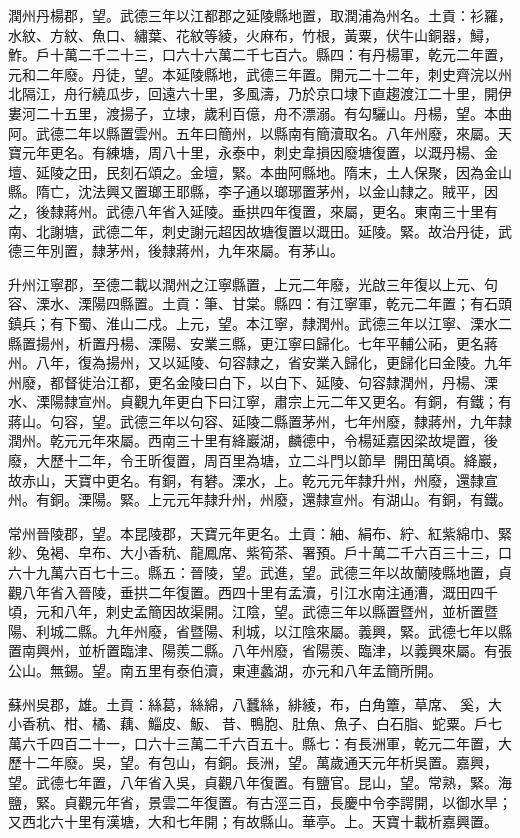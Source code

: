 \begin{pinyinscope}
 潤州丹楊郡，望。武德三年以江都郡之延陵縣地置，取潤浦為州名。土貢：衫羅，水紋、方紋、魚口、繡葉、花紋等綾，火麻布，竹根，黃粟，伏牛山銅器，鱘，鮓。戶十萬二千二十三，口六十六萬二千七百六。縣四：有丹楊軍，乾元二年置，元和二年廢。丹徒，望。本延陵縣地，武德三年置。開元二十二年，刺史齊浣以州北隔江，舟行繞瓜步，回遠六十里，多風濤，乃於京口埭下直趨渡江二十里，開伊婁河二十五里，渡揚子，立埭，歲利百億，舟不漂溺。有勾驪山。丹楊，望。本曲阿。武德二年以縣置雲州。五年曰簡州，以縣南有簡瀆取名。八年州廢，來屬。天寶元年更名。有練塘，周八十里，永泰中，刺史韋損因廢塘復置，以溉丹楊、金壇、延陵之田，民刻石頌之。金壇，緊。本曲阿縣地。隋末，土人保聚，因為金山縣。隋亡，沈法興又置瑯王耶縣，李子通以瑯琊置茅州，以金山隸之。賊平，因之，後隸蔣州。武德八年省入延陵。垂拱四年復置，來屬，更名。東南三十里有南、北謝塘，武德二年，刺史謝元超因故塘復置以溉田。延陵。緊。故治丹徒，武德三年別置，隸茅州，後隸蔣州，九年來屬。有茅山。



 升州江寧郡，至德二載以潤州之江寧縣置，上元二年廢，光啟三年復以上元、句容、溧水、溧陽四縣置。土貢：筆、甘棠。縣四：有江寧軍，乾元二年置；有石頭鎮兵；有下蜀、淮山二戍。上元，望。本江寧，隸潤州。武德三年以江寧、溧水二縣置揚州，析置丹楊、溧陽、安業三縣，更江寧曰歸化。七年平輔公祏，更名蔣州。八年，復為揚州，又以延陵、句容隸之，省安業入歸化，更歸化曰金陵。九年州廢，都督徙治江都，更名金陵曰白下，以白下、延陵、句容隸潤州，丹楊、溧水、溧陽隸宣州。貞觀九年更白下曰江寧，肅宗上元二年又更名。有銅，有鐵；有蔣山。句容，望。武德三年以句容、延陵二縣置茅州，七年州廢，隸蔣州，九年隸潤州。乾元元年來屬。西南三十里有絳巖湖，麟德中，令楊延嘉因梁故堤置，後廢，大歷十二年，令王昕復置，周百里為塘，立二斗門以節旱，開田萬頃。絳巖，故赤山，天寶中更名。有銅，有礬。溧水，上。乾元元年隸升州，州廢，還隸宣州。有銅。溧陽。緊。上元元年隸升州，州廢，還隸宣州。有湖山。有銅，有鐵。



 常州晉陵郡，望。本昆陵郡，天寶元年更名。土貢：紬、絹布、紵、紅紫綿巾、緊紗、兔褐、皁布、大小香秔、龍鳳席、紫筍茶、署預。戶十萬二千六百三十三，口六十九萬六百七十三。縣五：晉陵，望。武進，望。武德三年以故蘭陵縣地置，貞觀八年省入晉陵，垂拱二年復置。西四十里有孟瀆，引江水南注通漕，溉田四千頃，元和八年，刺史孟簡因故渠開。江陰，望。武德三年以縣置暨州，並析置暨陽、利城二縣。九年州廢，省暨陽、利城，以江陰來屬。義興，緊。武德七年以縣置南興州，並析置臨津、陽羨二縣。八年州廢，省陽羨、臨津，以義興來屬。有張公山。無錫。望。南五里有泰伯瀆，東連蠡湖，亦元和八年孟簡所開。



 蘇州吳郡，雄。土貢：絲葛，絲綿，八蠶絲，緋綾，布，白角簟，草席、奚，大小香秔、柑、橘、藕、鯔皮、魬、昔、鴨胞、肚魚、魚子、白石脂、蛇粟。戶七萬六千四百二十一，口六十三萬二千六百五十。縣七：有長洲軍，乾元二年置，大歷十二年廢。吳，望。有包山，有銅。長洲，望。萬歲通天元年析吳置。嘉興，望。武德七年置，八年省入吳，貞觀八年復置。有鹽官。昆山，望。常熟，緊。海鹽，緊。貞觀元年省，景雲二年復置。有古涇三百，長慶中令李諤開，以御水旱；又西北六十里有漢塘，大和七年開；有故縣山。華亭。上。天寶十載析嘉興置。




\end{pinyinscope}
